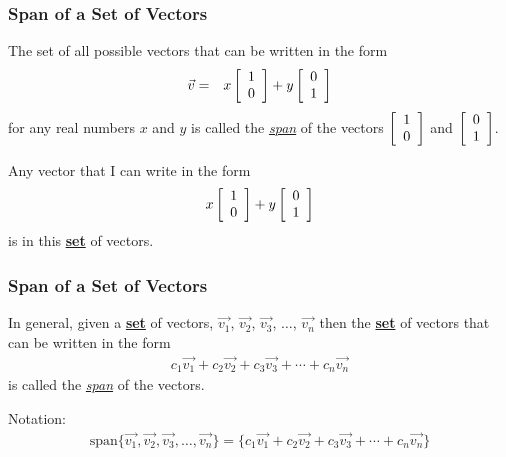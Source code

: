\begin{frame}
  \frametitle{Span of a Set of Vectors}

  {\color{brown}The set} of all possible vectors 
  that can be written in the form
  \begin{eqnarray*}
    \vec{v} & = & x \left[ \begin{array}{r} 1 \\ 0 \end{array} \right] + y \left[ \begin{array}{r} 0 \\ 1 \end{array} \right]
  \end{eqnarray*}
  for any real numbers $x$ and $y$ is called  
  {the \color{red}\textit{\underline{span}} of the
  vectors $\left[ \begin{array}{r} 1 \\ 0 \end{array} \right]$ and $\left[ \begin{array}{r} 0 \\ 1 \end{array} \right]$}. 

  \vfill

  {
    Any vector that I can write in the form
    \begin{eqnarray*}
      x \left[ \begin{array}{r} 1 \\ 0 \end{array} \right] + y \left[ \begin{array}{r} 0 \\ 1 \end{array} \right]
    \end{eqnarray*}
    is in this \textbf{\underline{set}} of vectors.
  }

\end{frame}


\begin{frame}
  \frametitle{Span of a Set of Vectors}

  In general, given a \textbf{\underline{set}} of vectors, $\vec{v_1}$, $\vec{v_2}$, $\vec{v_3}$,
  $\ldots$, $\vec{v_n}$ then the \textbf{\underline{set}} of vectors
  that can be written in the form
  \begin{eqnarray*}
    c_1 \vec{v_1} + c_2 \vec{v_2} + c_3 \vec{v_3} + \cdots + c_n \vec{v_n}
  \end{eqnarray*}
  is called {\color{red}the \textit{\underline{span}} of the vectors.}

  {
    Notation:
    {\color{blue}
     \begin{eqnarray*}
      \mathrm{span}\{\vec{v_1}, \vec{v_2}, \vec{v_3},\ldots, \vec{v_n} \}
    = \{c_1 \vec{v_1} + c_2 \vec{v_2} + c_3 \vec{v_3} + \cdots + c_n \vec{v_n}\}
    \end{eqnarray*}
    }
  }

\end{frame}


